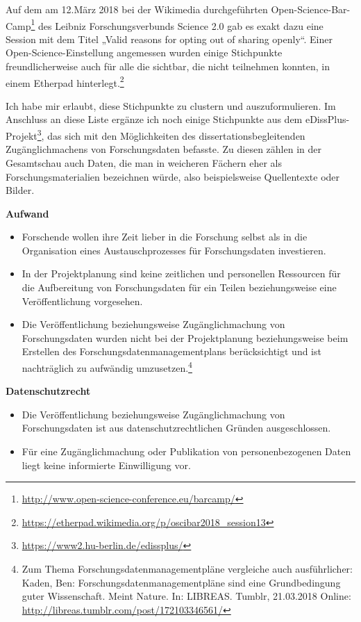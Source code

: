 \documentclass[a4paper,
fontsize=11pt,
oneside,
numbers=noperiodatend,
parskip=half-,
bibliography=totoc,
final
]{scrartcl}
\begin{document}
Auf dem am 12.März 2018 bei der Wikimedia durchgeführten
Open-Science-Bar-Camp\footnote{\url{http://www.open-science-conference.eu/barcamp/}}
des Leibniz Forschungsverbunds Science 2.0 gab es exakt dazu eine
Session mit dem Titel „Valid reasons for opting out of sharing openly``.
Einer Open-Science-Einstellung angemessen wurden einige Stichpunkte
freundlicherweise auch für alle die sichtbar, die nicht teilnehmen
konnten, in einem Etherpad hinterlegt.\footnote{\url{https://etherpad.wikimedia.org/p/oscibar2018_session13}}

Ich habe mir erlaubt, diese Stichpunkte zu clustern und
auszuformulieren. Im Anschluss an diese Liste ergänze ich noch einige
Stichpunkte aus dem eDissPlus-Projekt\footnote{\url{https://www2.hu-berlin.de/edissplus/}},
das sich mit den Möglichkeiten des dissertationsbegleitenden
Zugänglichmachens von Forschungsdaten befasste. Zu diesen zählen in der
Gesamtschau auch Daten, die man in weicheren Fächern eher als
Forschungsmaterialien bezeichnen würde, also beispielsweise Quellentexte
oder Bilder.

\textbf{Aufwand}

\begin{itemize}
\item
  Forschende wollen ihre Zeit lieber in die Forschung selbst als in die
  Organisation eines Austauschprozesses für Forschungsdaten investieren.
\item
  In der Projektplanung sind keine zeitlichen und personellen Ressourcen
  für die Aufbereitung von Forschungsdaten für ein Teilen
  beziehungsweise eine Veröffentlichung vorgesehen.
\item
  Die Veröffentlichung beziehungsweise Zugänglichmachung von
  Forschungsdaten wurden nicht bei der Projektplanung beziehungsweise
  beim Erstellen des Forschungsdatenmanagementplans berücksichtigt und
  ist nachträglich zu aufwändig umzusetzen.\footnote{Zum Thema
    Forschungsdatenmanagementpläne vergleiche auch ausführlicher: Kaden,
    Ben: Forschungsdatenmanagementpläne sind eine Grundbedingung guter
    Wissenschaft. Meint Nature. In: LIBREAS. Tumblr, 21.03.2018 Online:
    \url{http://libreas.tumblr.com/post/172103346561/}}
\end{itemize}

\textbf{Datenschutzrecht}

\begin{itemize}
\item
  Die Veröffentlichung beziehungsweise Zugänglichmachung von
  Forschungsdaten ist aus datenschutzrechtlichen Gründen ausgeschlossen.
\item
  Für eine Zugänglichmachung oder Publikation von personenbezogenen
  Daten liegt keine informierte Einwilligung vor.
\end{itemize}
\end{document}
